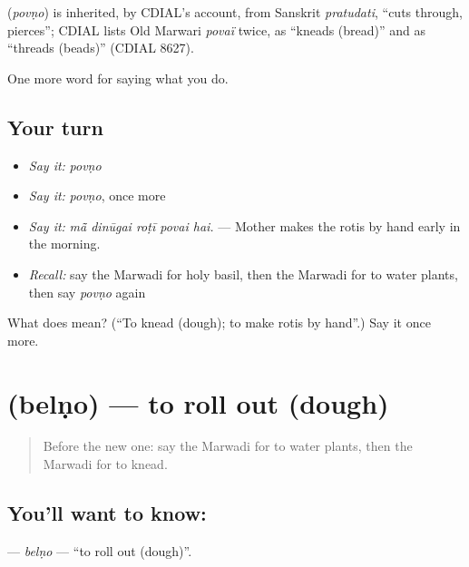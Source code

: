 \begin{cousinweb}
\textbf{} (\emph{povṇo}) is inherited, by CDIAL's account, from Sanskrit \emph{pratudati}, \textquotedblleft{}cuts through, pierces\textquotedblright{}; CDIAL lists Old Marwari \emph{povaï} twice, as \textquotedblleft{}kneads (bread)\textquotedblright{} and as \textquotedblleft{}threads (beads)\textquotedblright{} (CDIAL 8627).
\end{cousinweb}

\begin{grammarlens}[title={What you've built}]
One more word for saying what you do.
\end{grammarlens}

\subsection*{Your turn}
\begin{itemize}
\raggedright
  \item \emph{Say it:} \emph{povṇo}
  \item \emph{Say it:} \emph{povṇo}, once more
  \item \emph{Say it:} \emph{mā̃ dinūgai roṭī povai hai.} — Mother makes the rotis by hand early in the morning.
  \item \emph{Recall:} say the Marwadi for holy basil, then the Marwadi for to water plants, then say \emph{povṇo} again
\end{itemize}

\begin{tcolorbox}[breakable,colback=teal!4,colframe=teal!35!black,title={Before you move on}]
What does  mean? (\textquotedblleft{}To knead (dough); to make rotis by hand\textquotedblright{}.) Say it once more.
\end{tcolorbox}
\section[\texorpdfstring{\mw{बेलणो} (belṇo)}{बेलणो (belṇo)}]{ (belṇo) — to roll out (dough)}

\label{lesson:MW-C169-belno}



\begin{quote}
Before the new one: say the Marwadi for to water plants, then the Marwadi for to knead.
\end{quote}

\subsection*{You'll want to know: }
\textbf{} — \emph{belṇo} — \textquotedblleft{}to roll out (dough)\textquotedblright{}.

